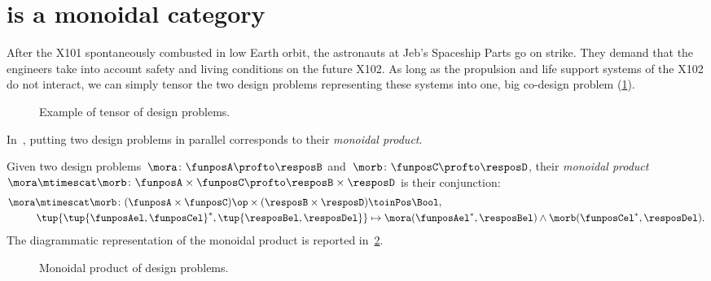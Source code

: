 

\section{\DP is a monoidal category}\label{sec:parallelism-DP-monoidal}
\begin{example}
  After the X101 spontaneously combusted in low Earth orbit, the astronauts at Jeb's Spaceship Parts go on strike. They demand that the engineers take into account safety and living conditions on the future X102. As long as the propulsion and life support systems of the X102 do not interact, we can simply tensor the two design problems representing these systems into one, big co-design problem (\cref{fig:examplemonoidal}).
  \begin{figure}[h!]
    \begin{center}
    \end{center}
    \caption{Example of tensor of design problems. \label{fig:examplemonoidal}}
  \end{figure}
\end{example}
In~\DP, putting two design problems in parallel corresponds to their \emph{monoidal product}.

\begin{definition}
  \label{def:monoidalproduct}
  Given two design problems~$\mora \colon \funposA \profto \resposB$ and~$\morb \colon \funposC \profto \resposD$, their \emph{monoidal product}~$\mora \mtimescat \morb \colon \funposA \times \funposC \profto \resposB\times \resposD$ is their conjunction:
  \begin{equation}
    \label{eq:monoidalprod_dp}
    \begin{aligned}
      \mora \mtimescat \morb \colon (\funposA \times \funposC)\op \times (\resposB \times \resposD) & \toinPos \Bool, \\
      \tup{\tup{\funposAel,\funposCel}^*,\tup{\resposBel,\resposDel}} &\mapsto \mora(\funposAel^*,\resposBel) \wedge \morb(\funposCel^*,\resposDel).
    \end{aligned}
  \end{equation}
  The diagrammatic representation of the monoidal product is reported in~\cref{fig:dpmonoidal}.
\end{definition}

\begin{figure}[h!]
  \begin{center}
  \end{center}
  \caption{Monoidal product of design problems. \label{fig:dpmonoidal}}
\end{figure}



